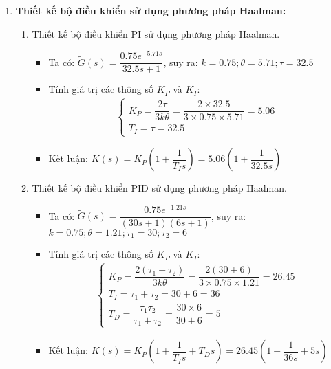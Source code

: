 \begin{solution}
\begin{enumerate}
        \item \textbf{Thiết kế bộ điều khiển sử dụng phương pháp Haalman:}
            \begin{enumerate}
                \item Thiết kế bộ điều khiển PI sử dụng phương pháp Haalman.
                    \begin{itemize}
                        \item Ta có: $\tilde{G}(s) = \dfrac{0.75e^{-5.71s}}{32.5s + 1}$, suy ra: $k = 0.75; \theta = 5.71; \tau = 32.5$
                        \item Tính giá trị các thông số $K_P$ và $K_I$:
                            \begin{align*}
                                \left\{\begin{array}{l}
                                    K_P = \dfrac{2 \tau}{3 k \theta} = \dfrac{2 \times 32.5}{3 \times 0.75 \times 5.71} = 5.06\\
                                    T_I = \tau = 32.5
                                \end{array}\right.
                            \end{align*}
                        \item Kết luận: $K(s) = K_P \left({1 + \dfrac{1}{T_I s}}\right) = 5.06 \left({1 + \dfrac{1}{32.5 s}}\right)$
                    \end{itemize}
                \item Thiết kế bộ điều khiển PID sử dụng phương pháp Haalman.
                    \begin{itemize}
                        \item Ta có: $\tilde{G}(s) = \dfrac{0.75 e^{-1.21 s}}{\left({30s + 1}\right) \left({6s + 1}\right)}$, suy ra: $k = 0.75; \theta = 1.21; \tau_1 = 30; \tau_2 = 6$
                        \item Tính giá trị các thông số $K_P$ và $K_I$:
                            \begin{align*}
                                \left\{\begin{array}{l}
                                    K_P = \dfrac{2 \left({\tau_1 + \tau_2}\right)}{3 k \theta} = \dfrac{2 \left({30 + 6}\right)}{3 \times 0.75 \times 1.21} = 26.45 \\
                                    T_I = \tau_1 + \tau_2 = 30 + 6 = 36 \\
                                    T_D = \dfrac{\tau_1 \tau_2}{\tau_1 + \tau_2} = \dfrac{30 \times 6}{30 + 6} = 5
                                \end{array}\right.
                            \end{align*}
                        \item Kết luận: $K(s) = K_P \left({1 + \dfrac{1}{T_I s} + T_D s}\right) = 26.45 \left({1 + \dfrac{1}{36s} + 5s}\right)$
                    \end{itemize}
            \end{enumerate}


\end{enumerate}
\end{solution}
